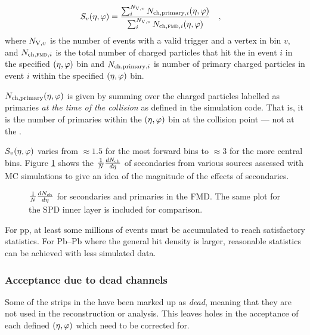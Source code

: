 \documentclass[11pt]{article}
\begin{document}
\begin{align}
  \label{eq:secondary}
  \SecMap{} &=
  \frac{\sum_i^{\NV[,v]}\mult[,\text{primary},i]\etaphi}{
    \sum_i^{\NV[,v]}\mult[,\text{\FMD{}},i]\etaphi}\quad,
\end{align}
where $\NV[,v]$ is the number of events with a valid trigger and a
vertex in bin $v$, and $\mult[,\FMD{},i]$ is the total number of
charged particles that hit the \FMD{} in event $i$ in the specified
$\etaphi$ bin and $\mult[,\text{primary},i]$ is number of
primary charged particles in event $i$ within the specified
$\etaphi$ bin.

$\mult[,\text{primary}]\etaphi$ is given by summing over the
charged particles labelled as primaries \emph{at the time of the
  collision} as defined in the simulation code.  That is, it is the
number of primaries within the $\etaphi$ bin at the collision
point --- not at the \FMD{}.

$\SecMap$ varies from $\approx 1.5$ for the most forward bins to
$\approx 3$ for the more central bins. Figure \ref{secondaries} shows
the $\dndeta$ of secondaries from various sources assessed with MC
simulations to give an idea of the magnitude of the effects of
secondaries.
\begin{figure}[]
  \centering
  \caption{$\dndeta$ for secondaries and primaries in the FMD. The
    same plot for the SPD inner layer is included for comparison.}
  \label{secondaries}
\end{figure} 
 
For pp, at least some millions of events must be
accumulated to reach satisfactory statistics.  For Pb--Pb where the
general hit density is larger, reasonable statistics can be achieved
with less simulated data.   

\subsubsection{Acceptance due to dead channels}

Some of the strips in the \FMD{} have been marked up as \emph{dead},
meaning that they are not used in the reconstruction or analysis.
This leaves holes in the acceptance of each defined $\etaphi$
which need to be corrected for.  
\end{document}
